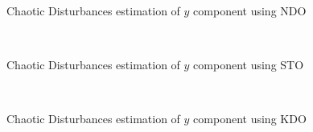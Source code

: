 \documentclass[letterpaper%
, twoside%
, 12pt%
,memoire%
, english%
,creativecommons,hyperref%
]{thETS}
\begin{document}
\begin{figure}[H]
\centering
{}
\\ \parbox{0.75\textwidth}{\caption{Chaotic Disturbances estimation of $y$ component using NDO} \label{dis_m2_est_y_ndo}}
\end{figure}

\begin{figure}[H]
\centering
{}
\\ \parbox{0.75\textwidth}{\caption{Chaotic Disturbances estimation of $y$ component using STO} \label{dis_m2_est_y_sto}}
\end{figure}

\begin{figure}[H]
\centering
{}
\\ \parbox{0.75\textwidth}{\caption{Chaotic Disturbances estimation of $y$ component using KDO} \label{dis_m2_est_y_kdo}}
\end{figure}
\end{document}
